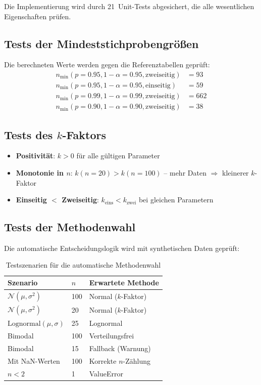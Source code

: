 \documentclass[10pt,a4paper,twocolumn]{article}
\theoremstyle{definition}
\begin{document}
Die Implementierung wird durch 21~Unit-Tests abgesichert, die
alle wesentlichen Eigenschaften prüfen.

\subsection{Tests der Mindeststichprobengrößen}

Die berechneten Werte werden gegen die Referenztabellen geprüft:
\begin{align*}
    n_{\min}(p{=}0.95, 1{-}\alpha{=}0.95, \text{zweiseitig}) &= 93 \\
    n_{\min}(p{=}0.95, 1{-}\alpha{=}0.95, \text{einseitig}) &= 59 \\
    n_{\min}(p{=}0.99, 1{-}\alpha{=}0.99, \text{zweiseitig}) &= 662 \\
    n_{\min}(p{=}0.90, 1{-}\alpha{=}0.90, \text{zweiseitig}) &= 38
\end{align*}

\subsection{Tests des $k$-Faktors}

\begin{itemize}[nosep,leftmargin=*]
    \item \textbf{Positivität}: $k > 0$ für alle gültigen Parameter
    \item \textbf{Monotonie in $n$}: $k(n=20) > k(n=100)$ --
          mehr Daten $\Rightarrow$ kleinerer $k$-Faktor
    \item \textbf{Einseitig $<$ Zweiseitig}: $k_{\text{eins}} < k_{\text{zwei}}$
          bei gleichen Parametern
\end{itemize}

\subsection{Tests der Methodenwahl}

Die automatische Entscheidungslogik wird mit synthetischen Daten
geprüft:

\begin{table}[H]
\centering
\caption{Testszenarien für die automatische Methodenwahl}
\label{tab:tests}
\small
\begin{tabular}{@{}lll@{}}
\toprule
Szenario & $n$ & Erwartete Methode \\
\midrule
$\mathcal{N}(\mu, \sigma^2)$ & 100 & Normal ($k$-Faktor) \\
$\mathcal{N}(\mu, \sigma^2)$ &  20 & Normal ($k$-Faktor) \\
$\text{Lognormal}(\mu, \sigma)$ &  25 & Lognormal \\
Bimodal & 100 & Verteilungsfrei \\
Bimodal &  15 & Fallback (Warnung) \\
Mit NaN-Werten & 100 & Korrekte $n$-Zählung \\
$n < 2$ & 1 & ValueError \\
\bottomrule
\end{tabular}
\end{table}
\end{document}
